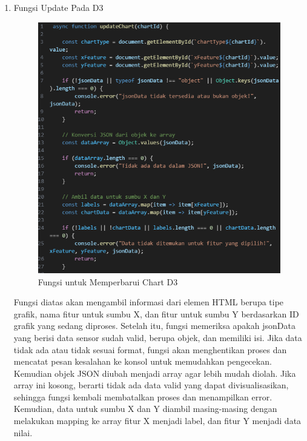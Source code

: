 \begin{enumerate}
	\item Fungsi Update Pada D3
		\begin{figure}[H]
		\centering
		\includegraphics[width=0.8\linewidth]{gambar/Pembahasan/Fungsi Update D3.png}
		\caption{Fungsi untuk Memperbarui Chart D3}
		\label{Fungsi untuk Memperbarui Chart D3}
	\end{figure}
	Fungsi diatas akan mengambil informasi dari elemen HTML berupa tipe grafik, nama fitur untuk sumbu X, dan fitur untuk sumbu Y berdasarkan ID grafik yang sedang diproses. Setelah itu, fungsi memeriksa apakah jsonData yang berisi data sensor sudah valid, berupa objek, dan memiliki isi. Jika data tidak ada atau tidak sesuai format, fungsi akan menghentikan proses dan mencatat pesan kesalahan ke konsol untuk memudahkan pengecekan. Kemudian objek JSON diubah menjadi array agar lebih mudah diolah. Jika array ini kosong, berarti tidak ada data valid yang dapat divisualisasikan, sehingga fungsi kembali membatalkan proses dan menampilkan error. Kemudian, data untuk sumbu X dan Y diambil masing-masing dengan melakukan mapping ke array fitur X menjadi label, dan fitur Y menjadi data nilai.	
\end{enumerate}



